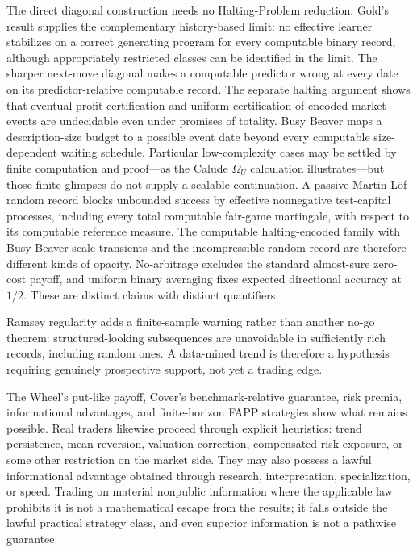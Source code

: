 \documentclass[aps,pra,reprint,superscriptaddress,amsmath,amssymb,floatfix]{revtex4-2}
\theoremstyle{plain}
\theoremstyle{definition}
\theoremstyle{remark}
\begin{document}
The direct diagonal construction needs no Halting-Problem reduction. Gold's
result supplies the complementary history-based limit: no effective
learner stabilizes on a correct generating program for every computable binary
record, although appropriately restricted classes can be identified in the
limit. The sharper next-move diagonal makes a computable predictor wrong at
every date on its predictor-relative computable record. The separate halting
argument shows that eventual-profit certification and uniform certification of
encoded market events are undecidable even under promises of totality.
Busy Beaver maps a description-size budget to a possible event date beyond
every computable size-dependent waiting schedule. Particular low-complexity
cases may be settled by finite computation and proof---as the Calude
\(\Omega_U\) calculation illustrates---but those finite glimpses do not supply
a scalable continuation. A passive Martin-L\"of-random record blocks unbounded
success by effective nonnegative test-capital processes, including every total
computable fair-game martingale, with respect to its computable reference
measure. The computable halting-encoded family with Busy-Beaver-scale
transients and the incompressible random record are therefore different kinds
of opacity. No-arbitrage excludes the standard almost-sure zero-cost payoff,
and uniform binary averaging fixes expected directional accuracy at \(1/2\).
These are distinct claims with distinct quantifiers.

Ramsey regularity adds a finite-sample warning rather than another no-go
theorem: structured-looking subsequences are unavoidable in sufficiently rich
records, including random ones. A data-mined trend is therefore a hypothesis
requiring genuinely prospective support, not yet a trading edge.

The Wheel's put-like payoff, Cover's benchmark-relative guarantee, risk
premia, informational advantages, and finite-horizon FAPP strategies show what
remains possible. Real traders likewise proceed through explicit heuristics:
trend persistence, mean reversion, valuation correction, compensated risk
exposure, or some other restriction on the market side. They may also possess
a lawful informational advantage obtained through research, interpretation,
specialization, or speed. Trading on material nonpublic information where the
applicable law prohibits it is not a mathematical escape from the results; it
falls outside the lawful practical strategy class, and even superior
information is not a pathwise guarantee.
\end{document}
